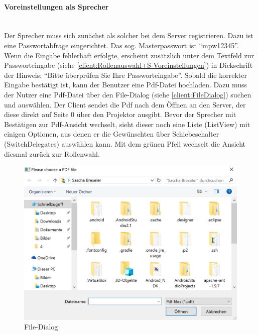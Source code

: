 \paragraph{Voreinstellungen als Sprecher}$\;$\\
Der Sprecher muss sich zunächst als solcher bei dem Server registrieren. Dazu ist eine Passwortabfrage eingerichtet. Das sog. Masterpasswort ist "`mpw12345"'. Wenn die Eingabe fehlerhaft erfolgte, erscheint zusätzlich unter dem Textfeld zur Passworteingabe (siehe \autoref{client:Rollenauswahl+S-Voreinstellungen}) in Dickschrift der Hinweis: "`Bitte überprüfen Sie Ihre Passworteingabe"'. Sobald die korrekter Eingabe bestätigt ist, kann der Benutzer eine Pdf-Datei hochladen. Dazu muss der Nutzer eine Pdf-Datei über den File-Dialog (siehe \autoref{client:FileDialog}) suchen und auswählen. Der Client sendet die Pdf nach dem Öffnen an den Server, der diese direkt auf Seite 0 über den Projektor ausgibt. Bevor der Sprecher mit Bestätigen zur Pdf-Ansicht wechselt, sieht dieser noch eine Liste (ListView) mit einigen Optionen, aus denen er die Gewünschten über Schiebeschalter (SwitchDelegates) auswählen kann. Mit dem grünen Pfeil wechselt die Ansicht diesmal zurück zur Rollenwahl.

\begin{figure}[ht!]
	\centering
	\includegraphics[scale=0.7]{GUI/Bilder/3-S-4-Voreinstellung.PNG}
	\caption{File-Dialog{\tiny}}
	\label{client:FileDialog}
\end{figure}

\newpage

